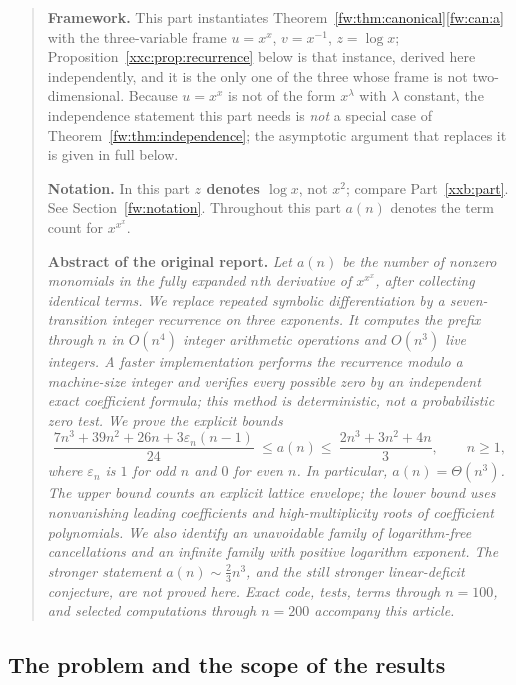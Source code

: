 \documentclass[11pt,a4paper]{article}
\numberwithin{equation}{section}
\theoremstyle{definition}
\theoremstyle{remark}
\theoremstyle{plain}
\newcommand{\epsn}{\varepsilon_n}
\begin{document}
\begin{quote}\small
\textbf{Framework.}  This part instantiates
Theorem~\ref{fw:thm:canonical}\ref{fw:can:a} with the three-variable frame
$u=x^x$, $v=x^{-1}$, $z=\log x$; Proposition~\ref{xxc:prop:recurrence} below is
that instance, derived here independently, and it is the only one of the three
whose frame is not two-dimensional.  Because $u=x^x$ is not of the form
$x^{\lambda}$ with $\lambda$ constant, the independence statement this part
needs is \emph{not} a special case of Theorem~\ref{fw:thm:independence}; the
asymptotic argument that replaces it is given in full below.

\smallskip
\textbf{Notation.}  In this part \textbf{$z$ denotes $\log x$}, not $x^2$;
compare Part~\ref{xxb:part}.  See Section~\ref{fw:notation}.  Throughout this
part $a(n)$ denotes the term count for $x^{x^x}$.

\medskip
\textbf{Abstract of the original report.}\itshape
Let $a(n)$ be the number of nonzero monomials in the fully expanded $n$th
derivative of $x^{x^x}$, after collecting identical terms. We replace repeated
symbolic differentiation by a seven-transition integer recurrence on three
exponents. It computes the prefix through $n$ in $O(n^4)$ integer arithmetic
operations and $O(n^3)$ live integers. A faster implementation performs the
recurrence modulo a machine-size integer and verifies every possible zero
by an independent exact coefficient formula; this method is deterministic,
not a probabilistic zero test. We prove the explicit bounds
\[
 \frac{7n^3+39n^2+26n+3\epsn(n-1)}{24}
 \ \le a(n)\le\ \frac{2n^3+3n^2+4n}{3},\qquad n\ge1,
\]
where $\epsn$ is $1$ for odd $n$ and $0$ for even $n$. In particular,
$a(n)=\Theta(n^3)$. The upper bound counts an explicit lattice envelope;
the lower bound uses nonvanishing leading coefficients and high-multiplicity
roots of coefficient polynomials. We also identify an unavoidable family of
logarithm-free cancellations and an infinite family with positive logarithm
exponent. The stronger statement $a(n)\sim \tfrac23n^3$, and the still stronger
linear-deficit conjecture, are \upshape\emph{not proved here}\itshape. Exact
code, tests, terms through $n=100$, and selected computations through $n=200$
accompany this article.
\end{quote}

\subsection{The problem and the scope of the results}
\end{document}
